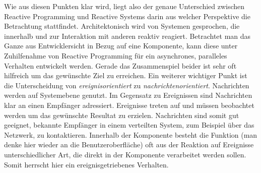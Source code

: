 Wie aus diesen Punkten klar wird, liegt also der genaue Unterschied zwischen Reactive Programming und Reactive Systems darin aus welcher Perspektive die Betrachtung stattfindet. Architektonisch wird von Systemen gesprochen, die innerhalb und zur Interaktion mit anderen reaktiv reagiert. Betrachtet man das Ganze aus Entwicklersicht in Bezug auf eine Komponente, kann diese unter Zuhilfenahme von Reactive Programming für ein asynchrones, paralleles Verhalten entwickelt werden. Gerade das Zusammenspiel beider ist sehr oft hilfreich um das gewünschte Ziel zu erreichen. Ein weiterer wichtiger Punkt ist die Unterscheidung von \textit{ereignisorientiert} zu \textit{nachrichtenorientiert}. Nachrichten werden auf Systemebene genutzt. Im Gegensatz zu Ereignissen sind Nachrichten klar an einen Empfänger adressiert. Ereignisse treten auf und müssen beobachtet werden um das gewünschte Resultat zu erzielen. Nachrichten sind somit gut geeignet, bekannte Empfänger in einem verteilten System, zum Beispiel über das Netzwerk, zu kontaktieren. Innerhalb der Komponente besteht die Funktion (man denke hier wieder an die Benutzeroberfläche) oft aus der Reaktion auf Ereignisse unterschiedlicher Art, die direkt in der Komponente verarbeitet werden sollen. Somit herrscht hier ein ereignisgetriebenes Verhalten. 

